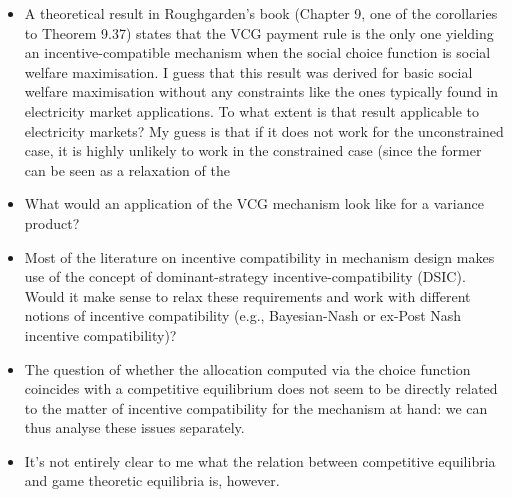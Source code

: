 \documentclass{article}
\begin{document}
\begin{itemize}
\item A theoretical result in Roughgarden's book (Chapter 9, one of the corollaries to Theorem 9.37) states that the VCG payment rule is the only one yielding an incentive-compatible mechanism when the social choice function is social welfare maximisation. I guess that this result was derived for basic social welfare maximisation without any constraints like the ones typically found in electricity market applications. To what extent is that result applicable to electricity markets? My guess is that if it does not work for the unconstrained case, it is highly unlikely to work in the constrained case (since the former can be seen as a relaxation of the 
\item What would an application of the VCG mechanism look like for a variance product?
\item Most of the literature on incentive compatibility in mechanism design makes use of the concept of dominant-strategy incentive-compatibility (DSIC). Would it make sense to relax these requirements and work with different notions of incentive compatibility (e.g., Bayesian-Nash or ex-Post Nash incentive compatibility)?
\item The question of whether the allocation computed via the choice function coincides with a competitive equilibrium does not seem to be directly related to the matter of incentive compatibility for the mechanism at hand: we can thus analyse these issues separately.
\item It's not entirely clear to me what the relation between competitive equilibria and game theoretic equilibria is, however.
\end{itemize}


\end{document}
